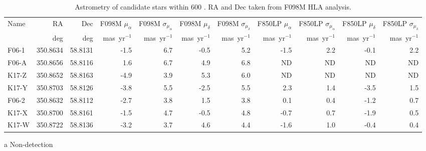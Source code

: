 \begin{table*}
\footnotesize
\begin{threeparttable}
\begin{tabular}{lrrrrrrrrrr}
\toprule
Name &       RA &     Dec & F098M $\mu_\alpha$ & F098M $\sigma_{\mu_\alpha}$ & F098M $\mu_\delta$ & F098M $\sigma_{\mu_\delta}$ & F850LP $\mu_\alpha$ & F850LP $\sigma_{\mu_\alpha}$ & F850LP $\mu_\delta$ & F850LP $\sigma_{\mu_\delta}$ \\
 &       deg   &  deg        &    mas~yr$^{-1}$                &          mas~yr$^{-1}$                   &        mas~yr$^{-1}$            &              mas~yr$^{-1}$               &         mas~yr$^{-1}$            &            mas~yr$^{-1}$                  &          mas~yr$^{-1}$           &                 mas~yr$^{-1}$             \\
\midrule
F06-1 & 350.8634 & 58.8131 &               -1.5 &                         6.7 &               -0.5 &                         5.2 &                -1.5 &                          2.2 &                -0.1 &                          2.2 \\
F06-A & 350.8656 & 58.8116 &                1.6 &                         6.7 &                4.9 &                         6.8 &                 ND\tnote{a} &                          ND\tnote{a} &                 ND\tnote{a} &                          ND\tnote{a} \\
K17-Z & 350.8652 & 58.8163 &               -4.9 &                         3.9 &                5.3 &                         6.0 &                 ND\tnote{a} &                          ND\tnote{a} &                 ND\tnote{a} &                          ND\tnote{a} \\
K17-Y & 350.8703 & 58.8126 &               -3.8 &                         5.5 &               -2.5 &                         5.5 &                 2.3 &                          1.4 &                -3.5 &                          1.5 \\
F06-2 & 350.8632 & 58.8112 &               -2.7 &                         3.8 &                1.5 &                         3.8 &                 0.1 &                          0.4 &                -1.2 &                          0.7 \\
K17-X & 350.8700 & 58.8161 &               -1.5 &                         4.7 &               -0.5 &                         4.8 &                -0.7 &                          0.7 &                -1.9 &                          0.5 \\
K17-W & 350.8722 & 58.8136 &               -3.2 &                         3.7 &                4.6 &                         4.4 &                -1.6 &                          1.0 &                -0.4 &                          0.4 \\
\bottomrule
\end{tabular}

\begin{tablenotes}
\item[a] Non-detection
\end{tablenotes}
\end{threeparttable}
\caption{Astrometry of candidate stars within 600 \kms. RA and Dec taken from F098M HLA analysis.}
\label{tab:astrometry}
\end{table*}
